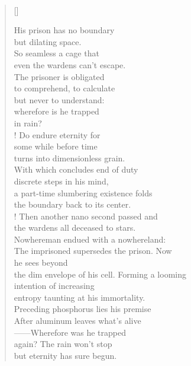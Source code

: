 \documentclass{book}
\begin{document}
\newpage
\poemtitle{\textcolor[RGB]{175,25,25}{The rainy redemption}}
\hspace*{\fill} \\
\settowidth{\versewidth}{the dim envelope of his cell. Forming a looming}
\begin{verse}[\versewidth]

    His prison has no boundary\\
    but dilating space.\\
    So seamless a cage that\\
    even the wardens can't escape.\\
    The prisoner is obligated\\
    to comprehend, to calculate\\
    but never to understand:\\
    wherefore is he trapped\\
    in rain?\\!
    Do endure eternity for\\
    some while before time\\
    turns into dimensionless grain.\\
    With which concludes end of duty\\
    discrete steps in his mind,\\
    a part-time slumbering existence folds\\
    the boundary back to its center.\\!
    Then another nano second passed and\\
    the wardens all deceased to stars.\\
    Nowhereman endued with a nowhereland:\\
    The imprisoned supersedes the prison. Now\\
    he sees beyond\\
    the dim envelope of his cell. Forming a looming\\
    intention of increasing\\
    entropy taunting at his immortality.\\
    Preceding phosphorus lies his premise\\
    After aluminum leaves what's alive\\
    ——Wherefore was he trapped\\
    again? The rain won't stop\\
    but eternity has sure begun.
\end{verse}
\end{document}
